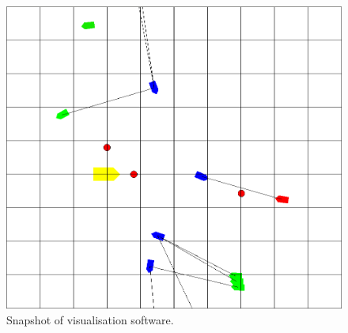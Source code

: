 \documentclass[bsc,frontabs,twoside,singlespacing,parskip,deptreport]{infthesis}     %
\begin{document}
\begin{figure}
    \centering
    \includegraphics[width=0.8\linewidth]{report/images/sim.png}
    \caption{Snapshot of visualisation software.}
    \label{fig:sim}
\end{figure}




\end{document}
